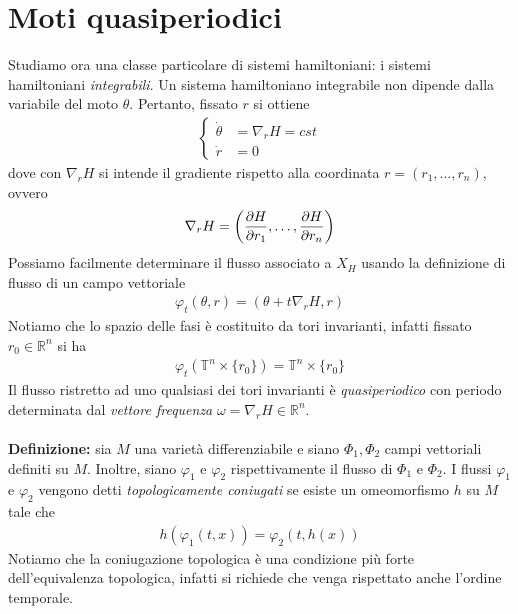 \documentclass{article}
\begin{document}
\section{Moti quasiperiodici}
Studiamo ora una classe particolare di sistemi hamiltoniani: i sistemi hamiltoniani \textit{integrabili}. Un sistema hamiltoniano integrabile non dipende dalla variabile del moto $\theta$. Pertanto, fissato $r$ si ottiene 
\begin{align}
    \begin{cases}
        \dot{\theta} &= \nabla_rH = cst \\
        \dot{r} &= 0
    \end{cases} \tag{2.1}
\end{align}
dove con $\nabla_rH$ si intende il gradiente rispetto alla coordinata $r = (r_1, \dots, r_n)$, ovvero 
\begin{align}
    \nabla_rH = \left(\frac{\partial H}{\partial r_1}, \dots, \frac{\partial H}{\partial r_n}\right) \notag
\end{align}
Possiamo facilmente determinare il flusso associato a $X_H$ usando la definizione di flusso di un campo vettoriale 
\begin{align}
    \varphi_t(\theta, r) = \left(\theta + t\nabla_rH, r\right) \tag{2.2}
\end{align}
Notiamo che lo spazio delle fasi è costituito da tori invarianti, infatti fissato $r_0 \in \mathbb{R}^n$ si ha 
\begin{align}
    \varphi_t\left(\mathbb{T}^n \times \{r_0\}\right) = \mathbb{T}^n \times \{r_0\} \tag{2.3}
\end{align}
Il flusso ristretto ad uno qualsiasi dei tori invarianti è \textit{quasiperiodico} con periodo determinata dal \textit{vettore frequenza} $\omega = \nabla_rH \in \mathbb{R}^n$. \\ \\
\textbf{Definizione:} sia $M$ una varietà differenziabile e siano $\Phi_1, \Phi_2$ campi vettoriali definiti su $M$. Inoltre, siano $\varphi_1$ e $\varphi_2$ rispettivamente il flusso di $\Phi_1$ e $\Phi_2$. I flussi $\varphi_1$ e $\varphi_2$ vengono detti \textit{topologicamente coniugati} se esiste un omeomorfismo $h$ su $M$ tale che
\begin{align}
    h(\varphi_1(t, x)) = \varphi_2(t, h(x)) \tag{2.4}
\end{align}
Notiamo che la coniugazione topologica è una condizione più forte dell'equivalenza topologica, infatti si richiede che venga rispettato anche l'ordine temporale. \\ \\
\end{document}
